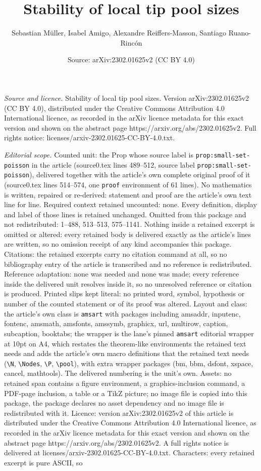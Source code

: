 \documentclass[10pt,a4paper]{amsart}
\title[Stability of local tip pool sizes]{Stability of local tip pool sizes}
\author{Sebastian M\"uller, Isabel Amigo, Alexandre Reiffers-Masson, Santiago Ruano-Rinc\'on}
\date{Source: arXiv:2302.01625v2 (CC BY 4.0)}
\begin{document}
\maketitle

\noindent\emph{Source and licence.} Stability of local tip pool sizes. Version arXiv:2302.01625v2 (CC BY 4.0), distributed under the Creative Commons Attribution 4.0 International licence, as recorded in the arXiv licence metadata for this exact version and shown on the abstract page https://arxiv.org/abs/2302.01625v2. Full rights notice: licenses/arxiv-2302.01625-CC-BY-4.0.txt.\par\smallskip

\noindent\textit{Editorial scope.} Counted unit: the Prop whose source label is \texttt{prop:small-set-poisson} in the article (source0.tex lines 489--512, source label \texttt{prop:small-set-poisson}), delivered together with the article's own complete original proof of it (source0.tex lines 514--574, one \texttt{proof} environment of 61 lines). No mathematics is written, repaired or re-derived: statement and proof are the article's own text line for line. Required context retained uncounted: none. Every definition, display and label of those lines is retained unchanged. Omitted from this package and not redistributed: 1--488, 513--513, 575--1141. Nothing inside a retained excerpt is omitted or altered: every retained body is delivered exactly as the article's lines are written, so no omission receipt of any kind accompanies this package. Citations: the retained excerpts carry no citation command at all, so no bibliography entry of the article is transcribed and no reference is redistributed. Reference adaptation: none was needed and none was made; every reference inside the delivered unit resolves inside it, so no unresolved reference or citation is produced. Printed slips kept literal: no printed word, symbol, hypothesis or number of the counted statement or of its proof was altered. Layout and class: the article's own class is \texttt{amsart} with packages including amsaddr, inputenc, fontenc, amsmath, amsfonts, amssymb, graphicx, url, multirow, caption, subcaption, booktabs; the wrapper is the lane's pinned \texttt{amsart} editorial wrapper at 10pt on A4, which restates the theorem-like environments the retained text needs and adds the article's own macro definitions that the retained text needs (\texttt{\textbackslash N}, \texttt{\textbackslash Nodes}, \texttt{\textbackslash P}, \texttt{\textbackslash pool}), with extra wrapper packages (bm, bbm, dsfont, xspace, cancel, mathtools). The delivered numbering is the unit's own. Assets: no retained span contains a figure environment, a graphics-inclusion command, a PDF-page inclusion, a table or a TikZ picture; no image file is copied into this package, the package declares no asset dependency and no image file is redistributed with it. Licence: version arXiv:2302.01625v2 of this article is distributed under the Creative Commons Attribution 4.0 International licence, as recorded in the arXiv licence metadata for this exact version and shown on the abstract page https://arxiv.org/abs/2302.01625v2. A full rights notice is delivered at licenses/arxiv-2302.01625-CC-BY-4.0.txt. Characters: every retained excerpt is pure ASCII, so 
\end{document}
